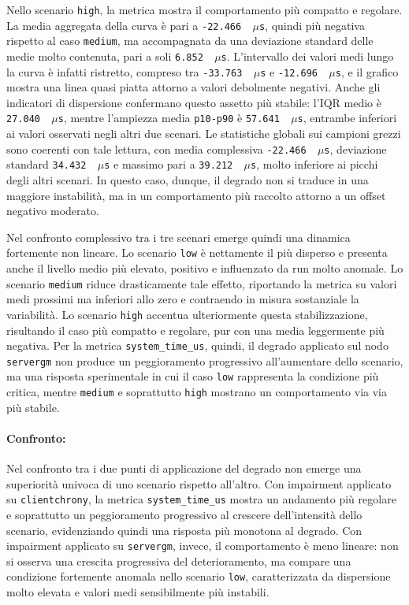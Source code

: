 Nello scenario \texttt{high}, la metrica mostra il comportamento più compatto e regolare.
La media aggregata della curva è pari a \texttt{-22.466 \,$\mu$s}, quindi più
negativa rispetto al caso \texttt{medium}, ma accompagnata da una deviazione
standard delle medie molto contenuta, pari a soli \texttt{6.852 \,$\mu$s}. L'intervallo
dei valori medi lungo la curva è infatti ristretto, compreso tra \texttt{-33.763 \,$\mu$s}
e \texttt{-12.696 \,$\mu$s}, e il grafico mostra una linea quasi piatta attorno a
valori debolmente negativi. Anche gli indicatori di dispersione confermano
questo assetto più stabile: l'IQR medio è \texttt{27.040 \,$\mu$s}, mentre l'ampiezza
media \texttt{p10-p90} è \texttt{57.641 \,$\mu$s}, entrambe inferiori ai valori
osservati negli altri due scenari. Le statistiche globali sui campioni grezzi sono
coerenti con tale lettura, con media complessiva \texttt{-22.466 \,$\mu$s},
deviazione standard \texttt{34.432 \,$\mu$s} e massimo pari a \texttt{39.212 \,$\mu$s},
molto inferiore ai picchi degli altri scenari. In questo caso, dunque, il
degrado non si traduce in una maggiore instabilità, ma in un comportamento più raccolto
attorno a un offset negativo moderato.

Nel confronto complessivo tra i tre scenari emerge quindi una dinamica fortemente
non lineare. Lo scenario \texttt{low} è nettamente il più disperso e presenta anche
il livello medio più elevato, positivo e influenzato da run molto anomale. Lo scenario
\texttt{medium} riduce drasticamente tale effetto, riportando la metrica su valori
medi prossimi ma inferiori allo zero e contraendo in misura sostanziale la variabilità.
Lo scenario \texttt{high} accentua ulteriormente questa stabilizzazione,
risultando il caso più compatto e regolare, pur con una media leggermente più negativa.
Per la metrica \texttt{system\_time\_us}, quindi, il degrado applicato sul nodo \texttt{servergm}
non produce un peggioramento progressivo all'aumentare dello scenario, ma una risposta
sperimentale in cui il caso \texttt{low} rappresenta la condizione più critica, mentre
\texttt{medium} e soprattutto \texttt{high} mostrano un comportamento via via più
stabile.

\paragraph*{Confronto:}
Nel confronto tra i due punti di applicazione del degrado non emerge una
superiorità univoca di uno scenario rispetto all'altro. Con impairment applicato su
\texttt{clientchrony}, la metrica \texttt{system\_time\_us} mostra un andamento
più regolare e soprattutto un peggioramento progressivo al crescere dell'intensità
dello scenario, evidenziando quindi una risposta più monotona al degrado. Con
impairment applicato su \texttt{servergm}, invece, il comportamento è meno lineare:
non si osserva una crescita progressiva del deterioramento, ma compare una condizione
fortemente anomala nello scenario \texttt{low}, caratterizzata da dispersione molto
elevata e valori medi sensibilmente più instabili.